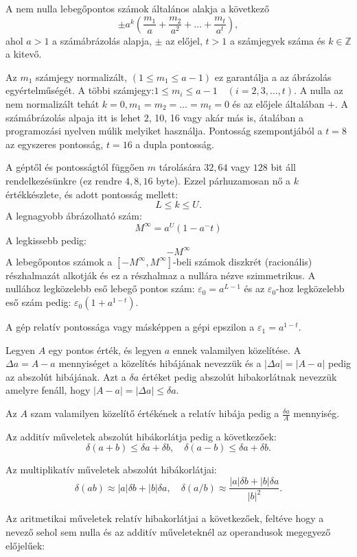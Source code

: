 A nem nulla lebegőpontos számok általános alakja a következő
\[
\pm a^k\left(\frac{m_1}{a}+\frac{m_2}{a^2}+\dots+\frac{m_t}{a^t}\right),
\]
ahol \(a > 1\) a számábrázolás alapja, \(\pm\) az előjel, \(t>1\) a számjegyek száma és \(k\in \mathbb{Z}\) a kitevő.

Az \(m_1\) számjegy normalizált, \((1\leq m_1 \leq a-1)\) ez garantálja
a az ábrázolás egyértelműségét. A többi
számjegy:\(1\leq m_i \leq a-1 \quad (i=2,3,\dots,t)\). A nulla az nem
normalizált tehát \(k=0, m_1=m_2=\dots=m_t=0\) és az előjele általában
\(+\). A számábrázolás alpaja itt is lehet 2, 10, 16 vagy akár más is,
átalában a programozási nyelven múlik melyiket használja. Pontosság
szempontjából a \(t=8\) az egyszeres pontosság, \(t=16\) a dupla pontosság.

A géptől és pontosságtól függően \(m\) tárolására \(32, 64\) vagy \(128\)
bit áll rendelkezésünkre (ez rendre \(4, 8, 16\) byte). Ezzel párhuzamosan
nő a \(k\) értékkészlete, és adott pontosság mellett:
\[
 L \leq k \leq U.
\]
A legnagyobb ábrázolható szám:
\[
M^\infty=a^U(1-a^-t)
\]
A legkissebb pedig:
\[
-M^\infty
\]
A lebegőpontos számok a \([-M^\infty,M^\infty]\)-beli számok diszkrét
(racionális) részhalmazát alkotják és ez a részhalmaz a nullára nézve
szimmetrikus. A nullához legközelebb eső lebegő pontos szám:
\(\varepsilon_0=a^{L-1}\) és az \(\varepsilon_0\)-hoz legközelebb eső
szám pedig: \(\varepsilon_0(1+a^{1-t})\).

A gép relatív pontossága vagy másképpen a gépi epszilon a
\(\varepsilon_1 = a^{1-t}\).


Legyen \(A\) egy pontos érték, és legyen \(a\) ennek valamilyen
közelítése. A \(\Delta a=A-a\) mennyiséget a közelítés hibájának
nevezzük és a \(|\Delta a|=|A-a|\) pedig az abszolút hibájának. Azt a
\(\delta a\) értéket pedig abszolút hibakorlátnak nevezzük amelyre
fenáll, hogy \(|A-a|=|\Delta a| \leq \delta a\).

Az \(A\) szam valamilyen közelítő értékének a relatív hibája pedig a
\(\frac {\delta a} {A}\) mennyiség.

Az additív műveletek abszolút hibákorlátja pedig a következőek:
\[
\delta(a+b) \leq \delta a+ \delta b, \quad
\delta(a-b) \leq \delta a+ \delta b.
\]

Az multiplikatív műveletek abszolút hibákorlátjai:
\[
\delta(ab) \approx |a|\delta b +|b| \delta a, \quad
\delta(a/b) \approx  \frac {|a|\delta b +|b| \delta a}{|b|^2}.
\]

Az aritmetikai műveletek relatív hibakorlátjai a következőek, feltéve
hogy a nevező sehol sem nulla és az additív műveleteknél az operandusok
megegyező előjelűek:

